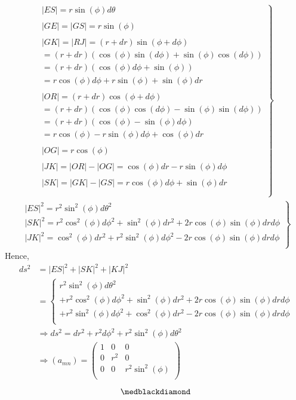 \begin{align}
\left.
\begin{array}{c}
\ |ES| = r\sin(\phi)d\theta\\\\
\ |GE| = |GS| = r\sin(\phi)\\\\
\ |GK| = |RJ| = (r+dr)\sin(\phi+d\phi) \\
\ =(r+dr)(\cos(\phi)\sin(d\phi)+\sin(\phi)\cos(d\phi) )\\
\ = (r+dr)(\cos(\phi)d\phi+\sin(\phi))\\
\ = r\cos(\phi)d\phi+r\sin(\phi)+\sin(\phi)dr\\\\
\ |OR| =  (r+dr)\cos(\phi+d\phi)\\
\ = (r+dr)(\cos(\phi)\cos(d\phi)-\sin(\phi)\sin(d\phi))\\
\ = (r+dr)(\cos(\phi)-\sin(\phi)d\phi)\\
\ = r\cos(\phi)-r\sin(\phi)d\phi + \cos(\phi)dr\\\\
\ |OG| = r\cos(\phi)\\\\
\ |JK| = |OR|-|OG| = \cos(\phi)dr-r\sin(\phi)d\phi\\\\
\ |SK| = |GK|-|GS| = r\cos(\phi)d\phi+\sin(\phi)dr\\\\
\end{array}
\right\}
\end{align}
\begin{align}
\left.
\begin{array}{c}
\ |ES|^2 = r^2\sin^2(\phi)d\theta^2\\
\ |SK|^2 = r^2\cos^2(\phi)d\phi^2+\sin^2(\phi)dr^2 +2r\cos(\phi)\sin(\phi)drd\phi \\
\ |JK|^2 = \cos^2(\phi)dr^2+r^2\sin^2(\phi)d\phi^2 -2r\cos(\phi)\sin(\phi)drd\phi\\
\end{array}
\right\}
\end{align}
Hence,
\begin{align}
\ ds^2 &= |ES|^2+|SK|^2+|KJ|^2\\
&= \left\{ \begin{array}{c} r^2\sin^2(\phi)d\theta^2 \\ +r^2\cos^2(\phi)d\phi^2+\sin^2(\phi)dr^2 +2r\cos(\phi)\sin(\phi)drd\phi\\+r^2\sin^2(\phi)d\phi^2+\cos^2(\phi)dr^2 -2r\cos(\phi)\sin(\phi)drd\phi\\
\end{array}
\right.\\
\ &\Rightarrow ds^2= dr^2 + r^2d\phi^2 + r^2\sin^2(\phi)d\theta^2\\
\ & \Rightarrow (a_{mn}) = \begin{pmatrix}
 1& 0 & 0\\
0 & r^2 & 0 \\
0 & 0 & r^2\sin^2(\phi) \\
\end{pmatrix}
\end{align}
$$\medblackdiamond$$
\newpage


